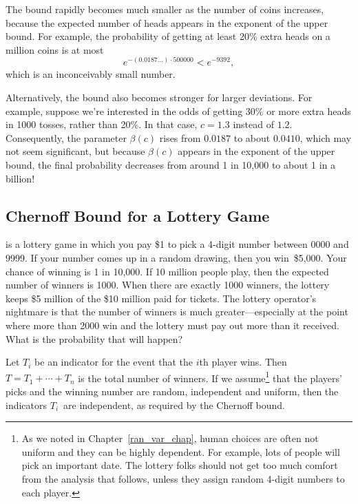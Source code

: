The bound rapidly becomes much smaller as the number of coins
increases, because the expected number of heads appears in the
exponent of the upper bound.  For example, the probability of getting
at least 20\% extra heads on a million coins is at most
\[
e^{- (0.0187\dots) \cdot 500000} < e^{-9392},
\]
which is an inconceivably small number.  %

Alternatively, the bound also becomes stronger for larger deviations.
For example, suppose we're interested in the odds of getting 30\% or
more extra heads in 1000 tosses, rather than 20\%.  In that case,
$c= 1.3$ instead of $1.2$.  Consequently, the parameter $\beta(c)$ rises from
$0.0187$ to about $0.0410$, which may not seem significant, but because
$\beta(c)$ appears in the exponent of the upper bound, the final probability
decreases from around 1 in 10,000 to about 1 in a billion!

\subsection{Chernoff Bound for a Lottery Game}

 is a lottery game in which you pay \$1 to pick a 4-digit
number between 0000 and 9999.  If your number comes up in a random
drawing, then you win~\$5,000.  Your chance of winning is 1 in 10,000.
If 10 million people play, then the expected number of winners is
1000.  When there are exactly 1000 winners, the lottery keeps \$5
million of the \$10 million paid for tickets.  The lottery operator's
nightmare is that the number of winners is much greater---especially
at the point where more than 2000 win and the lottery must pay out
more than it received.  What is the probability that will happen?

Let $T_i$ be an indicator for the event that the $i$th player wins.
Then $T = T_1 + \cdots + T_n$ is the total number of winners.  If we
assume\footnote{As we noted in Chapter~\ref{ran_var_chap}, human
  choices are often not uniform and they can be highly dependent.  For
  example, lots of people will pick an important date.  The lottery
  folks should not get too much comfort from the analysis that
  follows, unless they assign random 4-digit numbers to each player.}
that the players' picks and the winning number are random, independent
and uniform, then the indicators $T_i$~are independent, as required by
the Chernoff bound.

